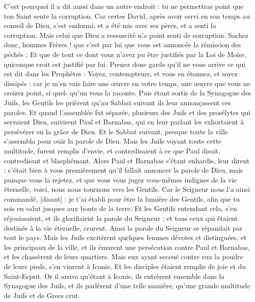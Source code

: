 \begin{multicols}{2}
C'est pourquoi il a dit aussi dans un autre endroit : tu ne permettras point que ton Saint sente la corruption.
Car certes David, après avoir servi en son temps au conseil de Dieu, s'est endormi, et a été mis avec ses pères, et a senti la corruption.
Mais celui que Dieu a ressuscité n'a point senti de corruption.
Sachez donc, hommes Frères ! que c'est par lui que vous est annoncée la rémission des péchés ;
Et que de tout ce dont vous n'avez pu être justifiés par la Loi de Moïse, quiconque croit est justifié par lui.
Prenez donc garde qu'il ne vous arrive ce qui est dit dans les Prophètes :
Voyez, contempteurs, et vous en étonnez, et soyez dissipés : car je m'en vais faire une œuvre en votre temps, une œuvre que vous ne croirez point, si quel- qu'un vous la raconte.
Puis étant sortis de la Synagogue des Juifs, les Gentils les prièrent qu'au Sabbat suivant ils leur annonçassent ces paroles.
Et quand l'assemblée fut séparée, plusieurs des Juifs et des prosélytes qui servaient Dieu, suivirent Paul et Barnabas, qui en leur parlant les exhortaient à persévérer en la grâce de Dieu.
Et le Sabbat suivant, presque toute la ville s'assembla pour ouïr la parole de Dieu.
Mais les Juifs voyant toute cette multitude, furent remplis d'envie, et contredisaient à ce que Paul disait, contredisant et blasphémant.
Alors Paul et Barnabas s'étant enhardis, leur dirent : c'était bien à vous premièrement qu'il fallait annoncer la parole de Dieu, mais puisque vous la rejetez, et que vous vous jugez vous-mêmes indignes de la vie éternelle, voici, nous nous tournons vers les Gentils.
Car le Seigneur nous l'a ainsi commandé, [disant] : je t'ai établi pour être la lumière des Gentils, afin que tu sois en salut jusques aux bouts de la terre.
Et les Gentils entendant cela, s'en réjouissaient, et ils glorifiaient la parole du Seigneur ; et tous ceux qui étaient destinés à la vie éternelle, crurent.
Ainsi la parole du Seigneur se répandait par tout le pays.
Mais les Juifs excitèrent quelques femmes dévotes et distinguées, et les principaux de la ville, et ils émurent une persécution contre Paul et Barnabas, et les chassèrent de leurs quartiers.
Mais eux ayant secoué contre eux la poudre de leurs pieds, s'en vinrent à Iconie.
Et les disciples étaient remplis de joie et du Saint-Esprit.
\VerseOne{}Or il arriva qu'étant à Iconie, ils entrèrent ensemble dans la Synagogue des Juifs, et ils parlèrent d'une telle manière, qu'une grande multitude de Juifs et de Grecs crut.

\end{multicols}
